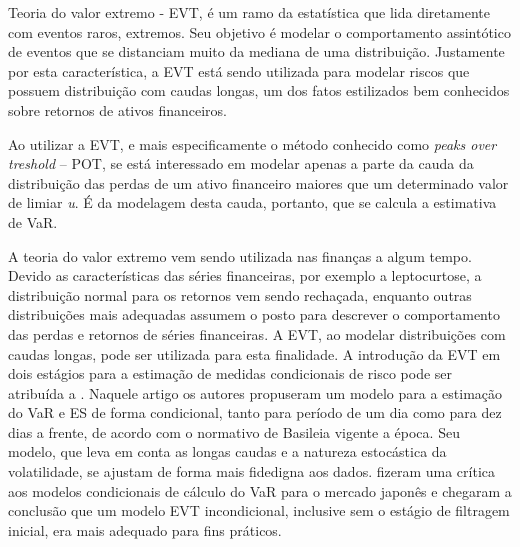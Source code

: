 \documentclass[1p]{elsarticle}
\theoremstyle{definition}
\begin{document}


Teoria do valor extremo - EVT, é um ramo da estatística que lida diretamente com eventos raros, extremos. Seu objetivo é modelar o comportamento assintótico de eventos que se distanciam muito da mediana de uma distribuição. Justamente por esta característica, a EVT está sendo utilizada para modelar riscos que possuem distribuição com caudas longas, um dos fatos estilizados bem conhecidos sobre retornos de ativos financeiros.

Ao utilizar a EVT, e mais especificamente o método conhecido como \emph{peaks over treshold} – POT, se está interessado em modelar apenas a parte da cauda da distribuição das perdas de um ativo financeiro maiores que um determinado valor de limiar \emph{u}. É da modelagem desta cauda, portanto, que se calcula a estimativa de VaR.

A teoria do valor extremo vem sendo utilizada nas finanças a algum tempo. Devido as características das séries financeiras, por exemplo a leptocurtose, a distribuição normal para os retornos vem sendo rechaçada, enquanto outras distribuições mais adequadas assumem o posto para descrever o comportamento das perdas e retornos de séries financeiras. A EVT, ao modelar distribuições com caudas longas, pode ser utilizada para esta finalidade. A introdução da EVT em dois estágios para a estimação de medidas condicionais de risco pode ser atribuída a \cite{McNeil2000}. Naquele artigo os autores propuseram um modelo para a estimação do VaR e ES de forma condicional, tanto para período de um dia como para dez dias a frente, de acordo com o normativo de Basileia vigente a época. Seu modelo, que leva em conta as longas caudas e a natureza estocástica da volatilidade, se ajustam de forma mais fidedigna aos dados. \cite{Danielsson2000} fizeram uma crítica aos modelos condicionais de cálculo do VaR para o mercado japonês e chegaram a conclusão que um modelo EVT incondicional, inclusive sem o estágio de filtragem inicial, era mais adequado para fins práticos.
\end{document}
